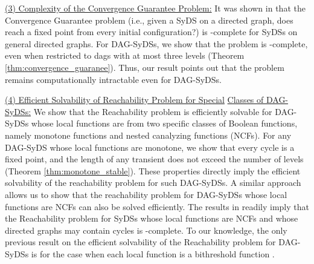 \smallskip

\noindent
\underline{(3) Complexity of the Convergence Guarantee Problem:}
It was shown in \cite{Chistikov-etal-2020} that
the Convergence Guarantee problem 
(i.e., given a SyDS \cals{} on
a directed graph, does \cals{} reach a fixed point from every
initial configuration?)  
is \cpsp-complete for SyDSs on general directed graphs.
For DAG-SyDSs, we show that the problem is \cconp-complete,
even when restricted to dags with at most  three levels 
(Theorem \ref{thm:convergence_guaranee}).
Thus, our result points out that the problem remains 
computationally intractable even for DAG-SyDSs.

\smallskip

\noindent
\underline{(4) Efficient Solvability of Reachability Problem for Special}\newline
\underline{Classes of DAG-SyDSs:} 
We show that the Reachability problem is efficiently solvable for
DAG-SyDSs whose local functions are from two specific
classes of Boolean functions, namely monotone functions and
nested canalyzing functions (NCFs).
For any DAG-SyDS whose local functions are monotone,
we show that every cycle is a fixed point, 
and the length of any transient does not exceed the number of levels
(Theorem \ref{thm:monotone_stable}).
These properties
directly imply the efficient solvability of the reachability
problem for such DAG-SyDSs.
A similar approach allows us to show that the reachability
problem for DAG-SyDSs whose local functions are NCFs can
also be solved efficiently. 
The results in \cite{Rosenkrantz-etal-2018} readily imply
that the Reachability problem for SyDSs whose local
functions are NCFs and whose directed graphs may contain cycles  
is \cpsp-complete.
To our knowledge, the only previous result on the efficient
solvability of the  Reachability problem for DAG-SyDSs is
for the case when each local function is a bithreshold
function \cite{KKM+2013}.

\iffalse
 we show
that the length of every phase space cycle is at most 2.
Moreover, if the number of levels of  \cals{} is $L$,
no transient is longer than $2L-1$
(Theorem \ref{thm:NCF_phase_space}).
These properties
directly imply the efficient solvability of the reachability
problem for such DAG-SyDSs.
\fi



